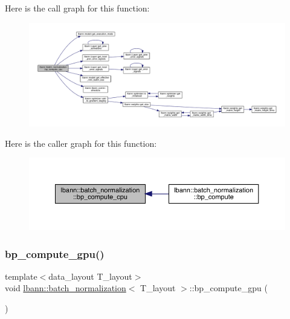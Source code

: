 Here is the call graph for this function\+:\nopagebreak
\begin{figure}[H]
\begin{center}
\leavevmode
\includegraphics[width=350pt]{classlbann_1_1batch__normalization_a83e40edd001a0b71c31fbc9a3acb2231_cgraph}
\end{center}
\end{figure}
Here is the caller graph for this function\+:\nopagebreak
\begin{figure}[H]
\begin{center}
\leavevmode
\includegraphics[width=350pt]{classlbann_1_1batch__normalization_a83e40edd001a0b71c31fbc9a3acb2231_icgraph}
\end{center}
\end{figure}
\mbox{\label{classlbann_1_1batch__normalization_a7d48ad1531825fc9745c77f9ae5f68d6}} 
\subsubsection{\texorpdfstring{bp\+\_\+compute\+\_\+gpu()}{bp\_compute\_gpu()}}
{\footnotesize\ttfamily template$<$data\+\_\+layout T\+\_\+layout$>$ \\
void \hyperlink{classlbann_1_1batch__normalization}{lbann\+::batch\+\_\+normalization}$<$ T\+\_\+layout $>$\+::bp\+\_\+compute\+\_\+gpu (\begin{DoxyParamCaption}{ }\end{DoxyParamCaption})\hspace{0.3cm}{\ttfamily [inline]}}



